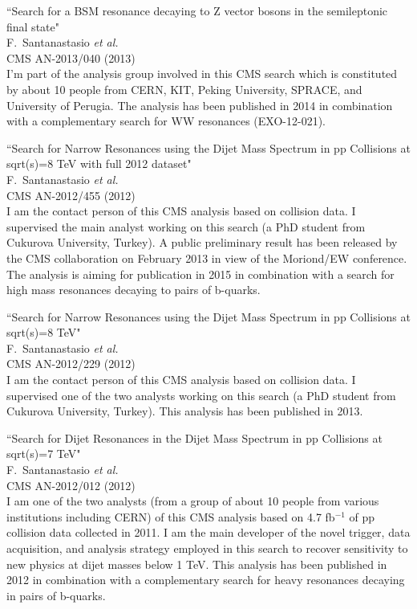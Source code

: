 \documentclass[10pt, a4paper]{article}
\begin{document}
\begin{thebibliography}{599}
``Search for a BSM resonance decaying to Z vector bosons in the semileptonic final state"
  \\{}F.~Santanastasio {\it et al.}
  \\{}CMS AN-2013/040 (2013)
  \\ I'm part of the analysis group involved in this CMS search which is constituted by about 10 people from CERN, KIT, Peking University, SPRACE, and University of Perugia. 
The analysis has been published in 2014 in combination with a complementary search for WW resonances (EXO-12-021).

``Search for Narrow Resonances using the Dijet Mass Spectrum in pp Collisions at sqrt(s)=8 TeV with full 2012 dataset"
  \\{}F.~Santanastasio {\it et al.}
  \\{}CMS AN-2012/455 (2012)
  \\ I am the contact person of this CMS analysis based on collision data. I supervised the main analyst working on this search (a PhD student from Cukurova University, Turkey). A public preliminary result has been released by the CMS collaboration on February 2013 in view of the Moriond/EW conference. The analysis is aiming for publication in 2015 in combination with a search for high mass resonances decaying to pairs of b-quarks.

``Search for Narrow Resonances using the Dijet Mass Spectrum in pp Collisions at sqrt(s)=8 TeV"
  \\{}F.~Santanastasio {\it et al.}
  \\{}CMS AN-2012/229 (2012)
  \\ I am the contact person of this CMS analysis based on collision data. I supervised one of the two analysts working on this search (a PhD student from Cukurova University, Turkey). This analysis has been published in 2013.

``Search for Dijet Resonances in the Dijet Mass Spectrum in pp Collisions at sqrt(s)=7 TeV"
  \\{}F.~Santanastasio {\it et al.}
  \\{}CMS AN-2012/012 (2012)
  \\ I am one of the two analysts (from a group of about 10 people from various 
  institutions including CERN) of this CMS analysis based on 4.7 fb$^{-1}$ of pp collision 
  data collected in 2011. I am the main developer of the novel trigger, data acquisition, and analysis strategy employed in this search to recover sensitivity to new physics at dijet masses below 1 TeV. This analysis has been published in 2012 in combination with a complementary search for heavy resonances decaying in pairs of b-quarks.


\end{thebibliography}
\end{document}
